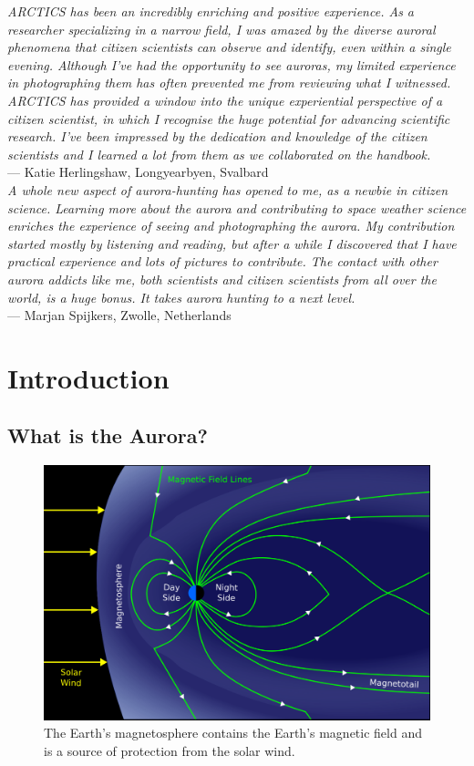 \documentclass{article}
\newcommand{\contributed}[1]{%
    \par\noindent
    \begingroup
    \setlength{\leftskip}{1em}%
    \itshape
    Contributors: #1
    \par
    \endgroup
    \vspace{0.5em}
}
\begin{document}
\textit{ARCTICS has been an incredibly enriching and positive experience. As a researcher specializing in a narrow field, I was amazed by the diverse auroral phenomena that citizen scientists can observe and identify, even within a single evening. Although I’ve had the opportunity to see auroras, my limited experience in photographing them has often prevented me from reviewing what I witnessed. ARCTICS has provided a window into the unique experiential perspective of a citizen scientist, in which I recognise the huge potential for advancing scientific research. I’ve been impressed by the dedication and knowledge of the citizen scientists and I learned a lot from them as we collaborated on the handbook.}\\
--- Katie Herlingshaw, Longyearbyen, Svalbard\\

\textit{A whole new aspect of aurora-hunting has opened to me, as a newbie in citizen science. Learning more about the aurora and contributing to space weather science enriches the experience of seeing and photographing the aurora. My contribution started mostly by listening and reading, but after a while I discovered that I have practical experience and lots of pictures to contribute. The contact with other aurora addicts like me, both scientists and citizen scientists from all over the world, is a huge bonus. It takes aurora hunting to a next level.}\\
--- Marjan Spijkers, Zwolle, Netherlands

\section{Introduction}

\subsection{What is the Aurora?} 
\begin{figure}
\includegraphics[width=\linewidth]{Fig1_magnetosphere.png}
\caption{The Earth's magnetosphere contains the Earth's magnetic field and is a source of protection from the solar wind.}
\label{fig-magnetosphere}
\end{figure} 
\end{document}
